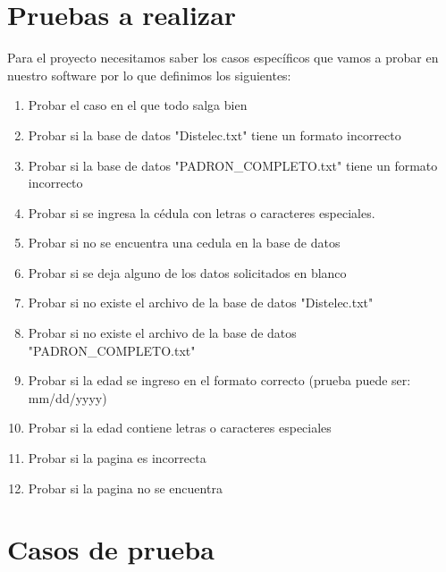 \documentclass[conference]{IEEEtran}
\begin{document}
\section{Pruebas a realizar}

Para el proyecto necesitamos saber los casos específicos que vamos a probar en nuestro software por lo que definimos los siguientes:

\begin{enumerate}

\item Probar el caso en el que todo salga bien

\item Probar si la base de datos "Distelec.txt" tiene un formato incorrecto

\item Probar si la base de datos "PADRON\_COMPLETO.txt" tiene un formato incorrecto

\item Probar si se ingresa la cédula con letras o caracteres especiales.

\item Probar si no se encuentra una cedula en la base de datos

\item Probar si se deja alguno de los datos solicitados en blanco

\item Probar si no existe el archivo de la base de datos "Distelec.txt"

\item Probar si no existe el archivo de la base de datos "PADRON\_COMPLETO.txt"

\item Probar si la edad se ingreso en el formato correcto (prueba puede ser: mm/dd/yyyy)

\item Probar si la edad contiene letras o caracteres especiales

\item Probar si la pagina es incorrecta 

\item Probar si la pagina no se encuentra

\end{enumerate}


\section{Casos de prueba}
\end{document}
